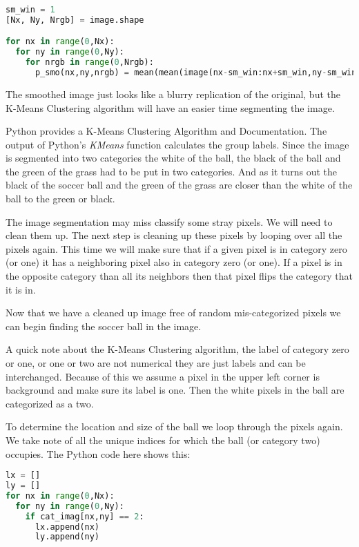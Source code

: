 \begin{lstlisting}[language=Python]
sm_win = 1
[Nx, Ny, Nrgb] = image.shape

for nx in range(0,Nx):
  for ny in range(0,Ny):
    for nrgb in range(0,Nrgb):
      p_smo(nx,ny,nrgb) = mean(mean(image(nx-sm_win:nx+sm_win,ny-sm_win:ny+sm_win,nrgb))
\end{lstlisting}

The smoothed image just looks like a blurry replication of the original, but the K-Means Clustering algorithm will have an easier time segmenting the image.

Python provides a K-Means Clustering Algorithm and Documentation. The output of Python's \emph{KMeans} function calculates the group labels. Since the image is segmented into two categories the white of the ball, the black of the ball and the green of the grass had to be put in two categories. And as it turns out the black of the soccer ball and the green of the grass are closer than the white of the ball to the green or black.

The image segmentation may miss classify some stray pixels. We will need to clean them up. The next step is cleaning up these pixels by looping over all the pixels again. This time we will make sure that if a given pixel is in category zero (or one) it has a neighboring pixel also in category zero (or one). If a pixel is in the opposite category than all its neighbors then that pixel flips the category that it is in. 

Now that we have a cleaned up image free of random mis-categorized pixels we can begin finding the soccer ball in the image.

A quick note about the K-Means Clustering algorithm, the label of category zero or one, or one or two are not numerical they are just labels and can be interchanged. Because of this we assume a pixel in the upper left corner is background and make sure its label is one. Then the white pixels in the ball are categorized as a two.

To determine the location and size of the ball we loop through the pixels again. We take note of all the unique indices for which the ball (or category two) occupies. The Python code here shows this:

\begin{lstlisting}[language=Python]
lx = []
ly = []
for nx in range(0,Nx):
  for ny in range(0,Ny):
    if cat_imag[nx,ny] == 2:
      lx.append(nx)
      ly.append(ny)
\end{lstlisting}


